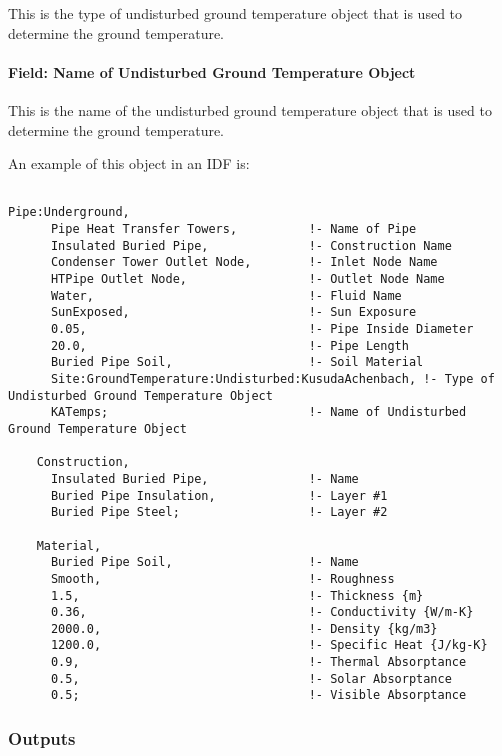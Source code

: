 This is the type of undisturbed ground temperature object that is used to determine the ground temperature.

\paragraph{Field: Name of Undisturbed Ground Temperature Object}\label{field-name-of-undisturbed-ground-temperature-object-001}

This is the name of the undisturbed ground temperature object that is used to determine the ground temperature.

An example of this object in an IDF is:

\begin{lstlisting}

Pipe:Underground,
      Pipe Heat Transfer Towers,          !- Name of Pipe
      Insulated Buried Pipe,              !- Construction Name
      Condenser Tower Outlet Node,        !- Inlet Node Name
      HTPipe Outlet Node,                 !- Outlet Node Name
      Water,                              !- Fluid Name
      SunExposed,                         !- Sun Exposure
      0.05,                               !- Pipe Inside Diameter
      20.0,                               !- Pipe Length
      Buried Pipe Soil,                   !- Soil Material
      Site:GroundTemperature:Undisturbed:KusudaAchenbach, !- Type of Undisturbed Ground Temperature Object
      KATemps;                            !- Name of Undisturbed Ground Temperature Object

    Construction,
      Insulated Buried Pipe,              !- Name
      Buried Pipe Insulation,             !- Layer #1
      Buried Pipe Steel;                  !- Layer #2

    Material,
      Buried Pipe Soil,                   !- Name
      Smooth,                             !- Roughness
      1.5,                                !- Thickness {m}
      0.36,                               !- Conductivity {W/m-K}
      2000.0,                             !- Density {kg/m3}
      1200.0,                             !- Specific Heat {J/kg-K}
      0.9,                                !- Thermal Absorptance
      0.5,                                !- Solar Absorptance
      0.5;                                !- Visible Absorptance
\end{lstlisting}

\subsubsection{Outputs}\label{outputs-8-004}

